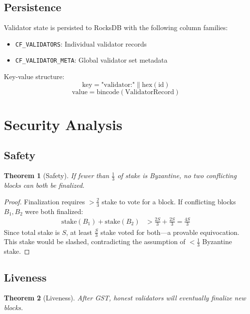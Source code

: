 \documentclass[11pt,a4paper]{article}
\newtheorem{theorem}{Theorem}
\begin{document}
\subsection{Persistence}

Validator state is persisted to RocksDB with the following column families:
\begin{itemize}
    \item \texttt{CF\_VALIDATORS}: Individual validator records
    \item \texttt{CF\_VALIDATOR\_META}: Global validator set metadata
\end{itemize}

Key-value structure:
$$\text{key} = \text{"validator:"} \| \text{hex}(\text{id})$$
$$\text{value} = \text{bincode}(\text{ValidatorRecord})$$

\section{Security Analysis}

\subsection{Safety}

\begin{theorem}[Safety]
If fewer than $\frac{1}{3}$ of stake is Byzantine, no two conflicting blocks can both be finalized.
\end{theorem}

\begin{proof}
Finalization requires $> \frac{2}{3}$ stake to vote for a block. If conflicting blocks $B_1, B_2$ were both finalized:
\begin{align*}
\text{stake}(B_1) + \text{stake}(B_2) &> \frac{2S}{3} + \frac{2S}{3} = \frac{4S}{3}
\end{align*}
Since total stake is $S$, at least $\frac{S}{3}$ stake voted for both---a provable equivocation. This stake would be slashed, contradicting the assumption of $< \frac{1}{3}$ Byzantine stake.
\end{proof}

\subsection{Liveness}

\begin{theorem}[Liveness]
After GST, honest validators will eventually finalize new blocks.
\end{theorem}
\end{document}
